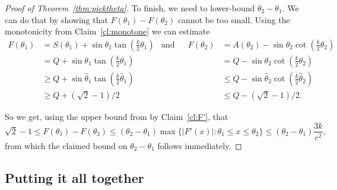 \documentclass{article}
\theoremstyle{definition}
\numberwithin{equation}{section}
\numberwithin{theorem}{section}
\newcommand{\htheta}{\hat{\theta}}
\begin{document}
\begin{proof}[Proof of Theorem~\ref{thm:picktheta}]
To finish, we need to lower-bound $\theta_2-\theta_1$. We can do that by showing that $F(\theta_1) - F(\theta_2)$ cannot be too small. Using the monotonicity from Claim~\ref{cl:monotone} we can estimate
\begin{align*}F(\theta_1) &= S(\theta_1) + \sin \theta_1 \tan\left(\tfrac{k}{2}\theta_1 \right) 
&\mbox{and}&& F(\theta_2) &= A(\theta_2) - \sin \theta_2 \cot\left(\tfrac{k}{2}\theta_2 \right)
\\ 
&= Q + \sin \theta_1 \tan\left(\tfrac{k}{2}\theta_1 \right) & & &  &= Q - \sin \theta_2 \cot\left(\tfrac{k}{2}\theta_2 \right)
\\ 
&\geq Q + \sin \htheta_1 \tan\left(\tfrac{k}{2}\htheta_1 \right) & & & &\leq Q - \sin \htheta_2 \cot\left(\tfrac{k}{2}\htheta_2 \right)
\\ 
&\geq Q + (\sqrt{2}-1)/2 
&&&   &\leq Q - (\sqrt{2}-1)/2.\end{align*}

So we get, using the upper bound from by Claim~\ref{cl:F'}, that
\[ \sqrt{2}-1 \leq F(\theta_1) - F(\theta_2) \leq (\theta_2 - \theta_1)\max\{|F'(x)|: \theta_1 \leq x \leq \theta_2\} \leq (\theta_2 -\theta_1) \frac{3k}{c^2},\] from which the claimed bound on $\theta_2 - \theta_1$ follows immediately.
\end{proof}

\subsection{Putting it all together}\label{sec:time}
\end{document}
